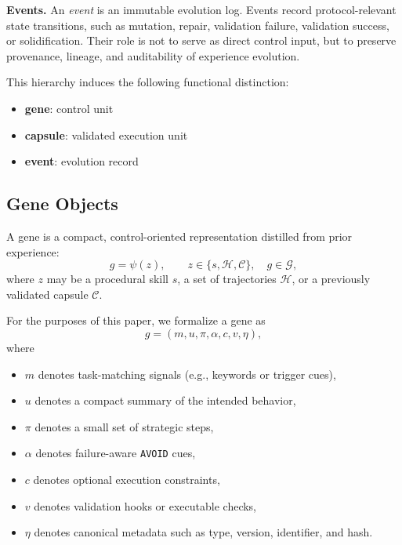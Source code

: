 \documentclass{article}
\newcommand{\nbf}[1]{{\noindent \textbf{#1}}}
\begin{document}
\nbf{Events.}
An \emph{event} is an immutable evolution log. 
Events record protocol-relevant state transitions, such as mutation, repair, validation failure, validation success, or solidification. 
Their role is not to serve as direct control input, but to preserve provenance, lineage, and auditability of experience evolution.

This hierarchy induces the following functional distinction:
\begin{itemize}
    \item \textbf{gene}: control unit
    \item \textbf{capsule}: validated execution unit
    \item \textbf{event}: evolution record
\end{itemize}

\subsection{Gene Objects}
\label{app:gep_gene}

A gene is a compact, control-oriented representation distilled from prior experience:
\begin{equation}
g=\psi(z), \qquad z \in \{s,\mathcal{H},\mathcal{C}\}, \quad g\in\mathcal{G},
\end{equation}
where $z$ may be a procedural skill $s$, a set of trajectories $\mathcal{H}$, or a previously validated capsule $\mathcal{C}$.

For the purposes of this paper, we formalize a gene as
\begin{equation}
g=(m,u,\pi,\alpha,c,v,\eta),
\end{equation}
where
\begin{itemize}
    \item $m$ denotes task-matching signals (e.g., keywords or trigger cues),
    \item $u$ denotes a compact summary of the intended behavior,
    \item $\pi$ denotes a small set of strategic steps,
    \item $\alpha$ denotes failure-aware \texttt{AVOID} cues,
    \item $c$ denotes optional execution constraints,
    \item $v$ denotes validation hooks or executable checks,
    \item $\eta$ denotes canonical metadata such as type, version, identifier, and hash.
\end{itemize}
\end{document}
